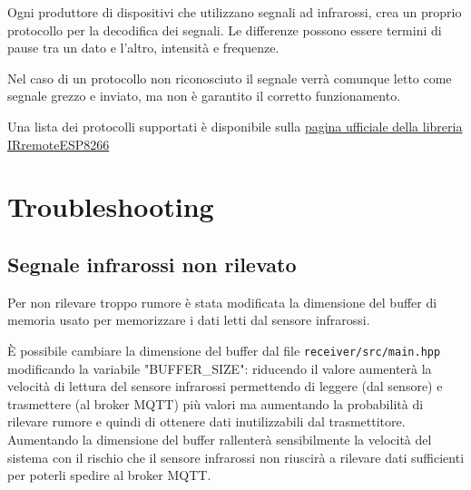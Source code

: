 \documentclass[a4paper,11pt]{article}
\begin{document}
    Ogni produttore di dispositivi che utilizzano segnali ad infrarossi, crea un proprio protocollo per la decodifica dei segnali.
    Le differenze possono essere termini di pause tra un dato e l'altro, intensità e frequenze.

    Nel caso di un protocollo non riconosciuto il segnale verrà comunque letto come segnale grezzo e inviato, ma non è garantito il corretto funzionamento.

    \bigskip
    \noindent
    Una lista dei protocolli supportati è disponibile sulla \href{https://github.com/crankyoldgit/IRremoteESP8266/blob/master/SupportedProtocols.md}{pagina ufficiale della libreria IRremoteESP8266}

\section{Troubleshooting}

    \subsection{Segnale infrarossi non rilevato}

    Per non rilevare troppo rumore è stata modificata la dimensione del buffer di memoria usato per memorizzare i dati letti dal sensore infrarossi.

    È possibile cambiare la dimensione del buffer dal file \texttt{receiver/src/main.hpp} modificando la variabile "BUFFER\_SIZE": riducendo il valore aumenterà la velocità di lettura 
    del sensore infrarossi permettendo di leggere (dal sensore) e trasmettere (al broker MQTT) più valori ma aumentando la probabilità di rilevare rumore e quindi di ottenere dati inutilizzabili dal trasmettitore.
    Aumentando la dimensione del buffer rallenterà sensibilmente la velocità del sistema con il rischio che il sensore infrarossi non riuscirà a rilevare dati sufficienti per poterli spedire al broker MQTT.

\clearpage

\listoffigures
{}
\end{document}

